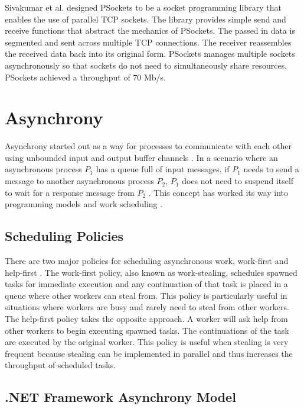 Sivakumar et al. designed PSockets \cite{Sivakumar2000psockets} to be a socket programming library that enables the use of parallel TCP sockets. The library provides simple send and receive functions that abstract the mechanics of PSockets. The passed in data is segmented and sent across multiple TCP connections. The receiver reassembles the received data back into its original form. PSockets manages multiple sockets asynchronously so that sockets do not need to simultaneously share resources. PSockets achieved a throughput of 70 Mb/s.

\section{Asynchrony}

Asynchrony started out as a way for processes to communicate with each other using unbounded input and output buffer channels \cite{Josephs1989}\cite{He1990}. In a scenario where an asynchronous process $P_1$ has a queue full of input messages, if $P_1$ needs to send a message to another asynchronous process $P_2$, $P_1$ does not need to suspend itself to wait for a response message from $P_2$ \cite{He1990}. This concept has worked its way into programming models and work scheduling \cite{Guo2009}\cite{Leijen2009}\cite{syme2011f}.

\subsection{Scheduling Policies}

There are two major policies for scheduling asynchronous work, work-first and help-first \cite{Guo2009}. The work-first policy, also known as work-stealing, schedules spawned tasks for immediate execution and any continuation of that task is placed in a queue where other workers can steal from. This policy is particularly useful in situations where workers are busy and rarely need to steal from other workers. The help-first policy takes the opposite approach. A worker will ask help from other workers to begin executing spawned tasks. The continuations of the task are executed by the original worker. This policy is useful when stealing is very frequent because stealing can be implemented in parallel and thus increases the throughput of scheduled tasks.

\subsection{.NET Framework Asynchrony Model}

